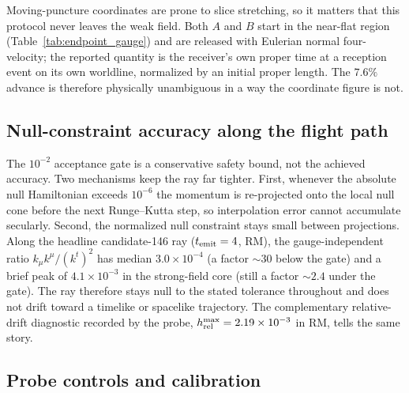 \documentclass[twocolumn,floatfix,aps,prd,nofootinbib]{revtex4-2}
\begin{document}
Moving-puncture coordinates are prone to slice stretching, so it matters that
this protocol never leaves the weak field. Both $A$ and $B$ start in the
near-flat region (Table~\ref{tab:endpoint_gauge}) and are released with
Eulerian normal four-velocity; the reported quantity is the receiver's own
proper time at a reception event on its own worldline, normalized by an
initial proper length. The $7.6\%$ advance is therefore physically unambiguous
in a way the coordinate figure is not.

\subsection{Null-constraint accuracy along the flight path}
\label{sec:null_accuracy}

The $10^{-2}$ acceptance gate is a conservative safety bound, not the achieved
accuracy. Two mechanisms keep the ray far tighter. First, whenever the absolute
null Hamiltonian exceeds $10^{-6}$ the momentum is re-projected onto the local
null cone before the next Runge--Kutta step, so interpolation error cannot
accumulate secularly. Second, the normalized null constraint stays small between
projections. Along the headline candidate-146 ray ($t_{\rm emit}=4$,
RM), the gauge-independent ratio $k_\mu k^\mu/(k^t)^2$ has median
$3.0\times10^{-4}$ (a factor ${\sim}30$ below the gate) and a brief peak of
$4.1\times10^{-3}$ in the strong-field core (still a factor ${\sim}2.4$ under
the gate). The ray therefore stays null to the stated tolerance throughout and
does not drift toward a timelike or spacelike trajectory. The complementary
relative-drift diagnostic recorded by the probe,
$h_{\rm rel}^{\rm max}=2.19\times10^{-3}$ in RM, tells the same story.

\subsection{Probe controls and calibration}
\end{document}
